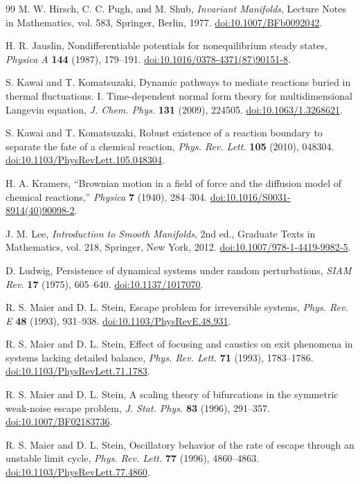 \documentclass[11pt]{article}
\theoremstyle{definition}
\theoremstyle{remark}
\newcommand{\doi}[1]{\href{https://doi.org/#1}{doi:#1}}
\begin{document}
\begin{thebibliography}{99}
M. W. Hirsch, C. C. Pugh, and M. Shub,
\emph{Invariant Manifolds},
Lecture Notes in Mathematics, vol. 583, Springer, Berlin, 1977.
\doi{10.1007/BFb0092042}.

H. R. Jauslin,
Nondifferentiable potentials for nonequilibrium steady states,
\emph{Physica A} \textbf{144} (1987), 179--191.
\doi{10.1016/0378-4371(87)90151-8}.

S. Kawai and T. Komatsuzaki,
Dynamic pathways to mediate reactions buried in thermal fluctuations. I. Time-dependent normal form theory for multidimensional Langevin equation,
\emph{J. Chem. Phys.} \textbf{131} (2009), 224505.
\doi{10.1063/1.3268621}.

S. Kawai and T. Komatsuzaki,
Robust existence of a reaction boundary to separate the fate of a chemical reaction,
\emph{Phys. Rev. Lett.} \textbf{105} (2010), 048304.
\doi{10.1103/PhysRevLett.105.048304}.

H. A. Kramers,
``Brownian motion in a field of force and the diffusion model of chemical reactions,''
\emph{Physica} \textbf{7} (1940), 284--304.
\doi{10.1016/S0031-8914(40)90098-2}.

J. M. Lee,
\emph{Introduction to Smooth Manifolds},
2nd ed., Graduate Texts in Mathematics, vol. 218, Springer, New York, 2012.
\doi{10.1007/978-1-4419-9982-5}.

D. Ludwig,
Persistence of dynamical systems under random perturbations,
\emph{SIAM Rev.} \textbf{17} (1975), 605--640.
\doi{10.1137/1017070}.

R. S. Maier and D. L. Stein,
Escape problem for irreversible systems,
\emph{Phys. Rev. E} \textbf{48} (1993), 931--938.
\doi{10.1103/PhysRevE.48.931}.

R. S. Maier and D. L. Stein,
Effect of focusing and caustics on exit phenomena in systems lacking detailed balance,
\emph{Phys. Rev. Lett.} \textbf{71} (1993), 1783--1786.
\doi{10.1103/PhysRevLett.71.1783}.

R. S. Maier and D. L. Stein,
A scaling theory of bifurcations in the symmetric weak-noise escape problem,
\emph{J. Stat. Phys.} \textbf{83} (1996), 291--357.
\doi{10.1007/BF02183736}.

R. S. Maier and D. L. Stein,
Oscillatory behavior of the rate of escape through an unstable limit cycle,
\emph{Phys. Rev. Lett.} \textbf{77} (1996), 4860--4863.
\doi{10.1103/PhysRevLett.77.4860}.


\end{thebibliography}
\end{document}
